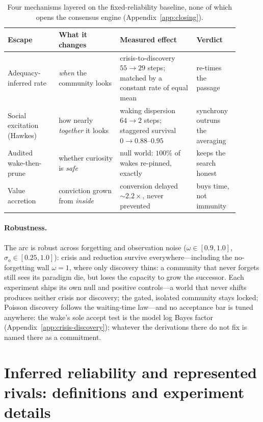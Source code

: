 \documentclass[runningheads]{llncs}
\begin{document}
\begin{table}[h!]
\centering\footnotesize
\begin{tabular}{p{0.20\linewidth}p{0.24\linewidth}p{0.30\linewidth}p{0.16\linewidth}}
\hline
Escape & What it changes & Measured effect & Verdict \\
\hline
Adequacy-inferred rate & \emph{when} the community looks & crisis-to-discovery $55\to29$ steps;
matched by a constant rate of equal mean & re-times the passage \\[2pt]
Social excitation (Hawkes) & how nearly \emph{together} it looks & waking dispersion $64\to2$
steps; staggered survival $0\to0.88$--$0.95$ & synchrony outruns the averaging \\[2pt]
Audited wake-then-prune & whether curiosity is \emph{safe} & null world: $100\%$ of wakes
re-pinned, exactly & keeps the search honest \\[2pt]
Value accretion & conviction grown from \emph{inside} & conversion delayed $\sim2.2\times$, never
prevented & buys time, not immunity \\
\hline
\end{tabular}
\caption{Four mechanisms layered on the fixed-reliability baseline, none of which opens the
consensus engine (Appendix~\ref{app:closing}).}
\label{tab:escapes}
\end{table}

\paragraph{Robustness.}
The arc is robust across forgetting and observation noise ($\omega\in[0.9,1.0]$,
$\sigma_o\in[0.25,1.0]$): crisis and reduction survive everywhere---including the no-forgetting
wall $\omega=1$, where only discovery thins: a community that never forgets still sees its
paradigm die, but loses the capacity to grow the successor. Each experiment ships its own null
and positive controls---a world that never shifts produces neither crisis nor discovery; the
gated, isolated community stays locked; Poisson discovery follows the waiting-time law---and no
acceptance bar is tuned anywhere: the wake's sole accept test is the model log Bayes factor
(Appendix~\ref{app:crisis-discovery}); whatever the derivations there do not fix is named there
as a commitment.

\section{Inferred reliability and represented rivals: definitions and experiment details}
\label{app:reliability}
\end{document}

